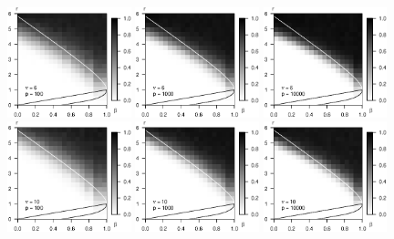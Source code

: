 \begin{figure}
      \includegraphics[width=0.32\textwidth]{./simulated_phase_diagram_chi-squared_nu6_p100.eps}
      \includegraphics[width=0.32\textwidth]{./simulated_phase_diagram_chi-squared_nu6_p1000.eps}
      \includegraphics[width=0.32\textwidth]{./simulated_phase_diagram_chi-squared_nu6_p10000.eps}
      \includegraphics[width=0.32\textwidth]{./simulated_phase_diagram_chi-squared_nu10_p100.eps}
      \includegraphics[width=0.32\textwidth]{./simulated_phase_diagram_chi-squared_nu10_p1000.eps}
      \includegraphics[width=0.32\textwidth]{./simulated_phase_diagram_chi-squared_nu10_p10000.eps}

\end{figure}

